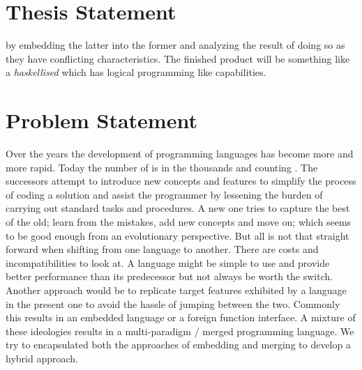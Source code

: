\documentclass[thesis-solanki.tex]{subfiles}
\begin{document}
\section{Thesis Statement}

 by embedding the latter into the former and analyzing the result of doing so as they have
conflicting characteristics.
The finished product will be something like a \textit{haskellised}  which has logical programming
like capabilities.


\section{Problem Statement}

Over the years the development of programming languages has become more and more rapid.
Today the number of is in the thousands and counting \cite{website:timelineproglangwiki,
  website:historyofproglang}.
The successors attempt to introduce new concepts and features to simplify the process of coding a solution and
assist the programmer by lessening the burden of carrying out standard tasks and procedures.
A new one tries to capture the best of the old; learn from the mistakes, add new concepts and move on; which seems
to be good enough from an evolutionary perspective.
But\butbut{} all is not that straight forward when shifting from one language to another.
There are costs and incompatibilities to look at.
A language might be simple to use and provide better performance than its predecessor but not always be worth the
switch.
Another approach would be to replicate target features exhibited by a language in the present one to avoid the
hassle of jumping between the two.
Commonly this results in an embedded language or a foreign function interface.
A mixture of these ideologies results in a multi-paradigm / merged programming language.
We try to encapsulated both the approaches of embedding and merging to develop a hybrid approach.

\end{document}
